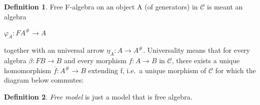 \documentclass[declaration,shortabstract]{iithesis}
\theoremstyle{definition} \newtheorem{definition}{Definition}[chapter]
\theoremstyle{remark} \newtheorem{remark}[definition]{Observation}
\theoremstyle{plain} \newtheorem{theorem}[definition]{Theorem}
\theoremstyle{plain} \newtheorem{lemma}[definition]{Lemma}
\begin{document}
    \begin{definition}

    Free F-algebra on an object A (of generators) in $\mathcal{C}$ is meant an algebra

    \begin{center}

    $ \varphi_{A} : F A^{\#} \longrightarrow A $

    \end{center}

    \noindent
    together with an universal arrow $ \eta_{A} : A \longrightarrow A^{\#} $.
    Universality means that for every algebra $ \beta : F B \longrightarrow B $
    and every morphism $ f : A \longrightarrow B $ in $ \mathcal{C}$, there
    exists a unique homomorphism $ \overline{f} : A^{\#} \longrightarrow B $
    extending f, i.e.\ a unique morphism of $ \mathcal{C}$ for which the diagram
    below commutes:

    \begin{center}
    \end{center}

    \end{definition}

    \begin{definition} \textit{Free model} is just a model that is free algebra.
    \end{definition}
\end{document}

